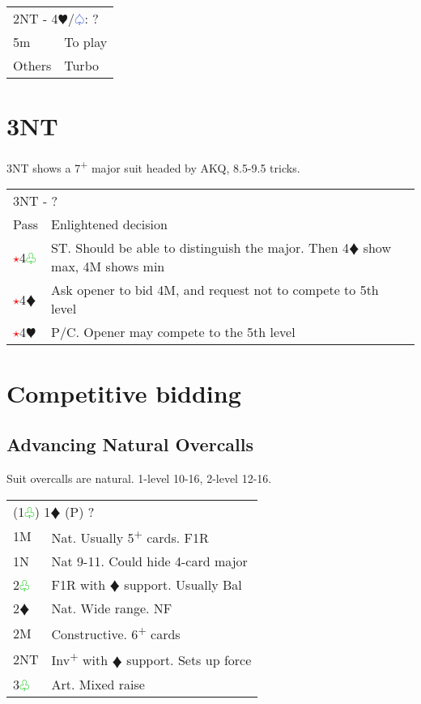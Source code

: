 \documentclass{article}
\renewcommand{\sp}{\textcolor{RoyalBlue}{$\varspade$}}
\newcommand{\he}{\textcolor{RubineRed}{$\varheart$}}
\newcommand{\di}{\textcolor{Peach}{$\vardiamond$}}
\newcommand{\cl}{\textcolor{LimeGreen}{$\varclub$}}
\newcommand{\nt}{\relsize{-1}NT\relsize{1}}
\newcommand{\up}{\textsuperscript{+}}
\newcommand{\al}{\textcolor{red}{$\star$}}
\begin{document}
\medskip

\begin{tabular}{|l|p{6.5cm}}
	\multicolumn{2}{l}{2\nt{} - 4\he/\sp{}: ?}\\
	5m & To play \\
	Others & Turbo \\
\end{tabular}

\section{3\nt{}}

3\nt{} shows a 7\up{} major suit headed by AKQ, 8.5-9.5 tricks. \\

\begin{tabular}{|l|p{6.5cm}}
	\multicolumn{2}{l}{3\nt{} - ?}\\
	Pass & Enlightened decision \\
	\al{}4\cl{} & ST. Should be able to distinguish the major. Then 4\di{} show max, 4M shows min \\
	\al{}4\di{} & Ask opener to bid 4M, and request not to compete to 5th level \\
	\al{}4\he{} & P/C. Opener may compete to the 5th level \\
\end{tabular}

\section{Competitive bidding}

\subsection{Advancing Natural Overcalls}
Suit overcalls are natural. 1-level 10-16, 2-level 12-16. \\

\begin{tabular}{|l|p{6.5cm}}
	\multicolumn{2}{l}{(1\cl{}) 1\di{} (P) ? } \\
	1M & Nat. Usually 5\up{} cards. F1R \\
	1N & Nat 9-11. Could hide 4-card major \\
	2\cl{} & F1R with \di{} support. Usually Bal \\
	2\di{} & Nat. Wide range. NF \\
	2M & Constructive. 6\up{} cards \\
	2\nt{} & Inv\up{} with \di{} support. Sets up force \\
	3\cl{} & Art. Mixed raise \\
\end{tabular}
\end{document}

